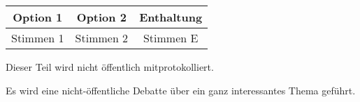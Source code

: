 \documentclass[
    gremium=FSR, %
    ngerman,      %
    wideoverview, %
]{fs-protokoll}
\begin{document}
\begin{center}
\begin{tabular}{c|c|c} 
    \textbf{Option 1} & \textbf{Option 2} & \textbf{Enthaltung}\\ \hline 
     Stimmen 1 & Stimmen 2 & Stimmen E
\end{tabular}
\end{center}

\begin{nichtoeff}
	Dieser Teil wird nicht öffentlich mitprotokolliert.
\end{nichtoeff}

\begin{oeff}
    Es wird eine nicht-öffentliche Debatte über ein ganz interessantes Thema geführt.
\end{oeff}


\end{document}
